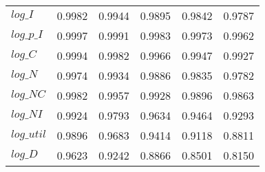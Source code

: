 \begin{center}
\begin{longtable}{lccccc}
$log\_I     $	 & 	    0.9982	 & 	    0.9944	 & 	    0.9895	 & 	    0.9842	 & 	    0.9787 \\ 
$log\_p\_I  $	 & 	    0.9997	 & 	    0.9991	 & 	    0.9983	 & 	    0.9973	 & 	    0.9962 \\ 
$log\_C     $	 & 	    0.9994	 & 	    0.9982	 & 	    0.9966	 & 	    0.9947	 & 	    0.9927 \\ 
$log\_N     $	 & 	    0.9974	 & 	    0.9934	 & 	    0.9886	 & 	    0.9835	 & 	    0.9782 \\ 
$log\_NC    $	 & 	    0.9982	 & 	    0.9957	 & 	    0.9928	 & 	    0.9896	 & 	    0.9863 \\ 
$log\_NI    $	 & 	    0.9924	 & 	    0.9793	 & 	    0.9634	 & 	    0.9464	 & 	    0.9293 \\ 
$log\_util  $	 & 	    0.9896	 & 	    0.9683	 & 	    0.9414	 & 	    0.9118	 & 	    0.8811 \\ 
$log\_D     $	 & 	    0.9623	 & 	    0.9242	 & 	    0.8866	 & 	    0.8501	 & 	    0.8150 \\ 
\end{longtable}
 \end{center}
